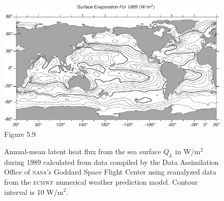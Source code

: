\begin{figure}[t!]
\includegraphics{pics/globallatent}
\footnotesize
Figure 5.9 \rule{0mm}{3ex}Annual-mean latent heat flux from the sea surface $Q_{L}$ in W/m$^2$ during
1989 calculated from data compiled by the Data Assimilation Office of \textsc{nasa}'s Goddard Space Flight Center
using reanalyzed data from the \textsc{ecmwf} numerical weather
prediction model. Contour interval is 10 W/m$^2$.
\label{fig:globallatent}
\vspace{-3ex}
\end{figure}

